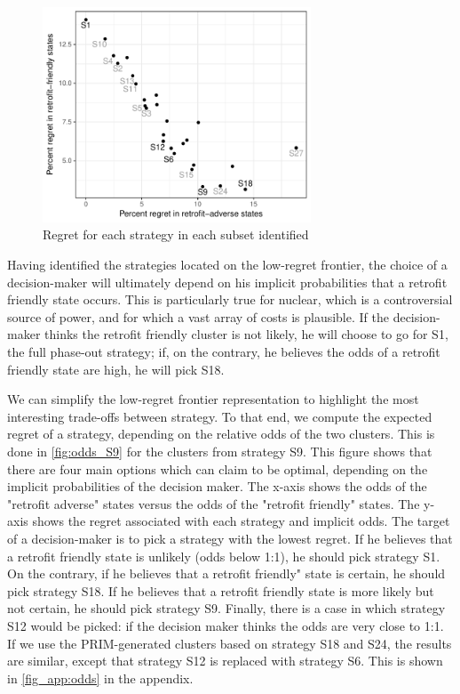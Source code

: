 \begin{figure}[!ht]
	\centering
	\includegraphics[width=8cm]{figures/low_regret_frontier_S9.pdf}
	\caption{Regret for each strategy in each subset identified}
	\label{fig:low_regret_frontier_S9}
\end{figure}

Having identified the strategies located on the low-regret frontier, the choice of a decision-maker will ultimately depend on his implicit probabilities that a retrofit friendly state occurs. 
This is particularly true for nuclear, which is a controversial source of power, and for which a vast array of costs is plausible. 
If the decision-maker thinks the retrofit friendly cluster is not likely, he will choose to go for S1, the full phase-out strategy; if, on the contrary, he believes the odds of a retrofit friendly state are high, he will pick S18. 

We can simplify the low-regret frontier representation to highlight the most interesting trade-offs between strategy. To that end, we compute the expected regret of a strategy, depending on the relative odds of the two clusters. This is done in \cref{fig:odds_S9} for the clusters from strategy S9. This figure shows that there are four main options which can claim to be optimal, depending on the implicit probabilities of the decision maker. 
The x-axis shows the odds of the "retrofit adverse" states versus the odds of the "retrofit friendly" states. 
The y-axis shows the regret associated with each strategy and implicit odds. 
The target of a decision-maker is to pick a strategy with the lowest regret. 
If he believes that a retrofit friendly state is unlikely (odds below 1:1), he should pick strategy S1. 
On the contrary, if he believes that a retrofit friendly" state is certain, he should pick strategy S18.
If he believes that a retrofit friendly state is more likely but not certain, he should pick strategy S9.
Finally, there is a case in which strategy S12 would be picked: if the decision maker thinks the odds are very close to 1:1.
If we use the PRIM-generated clusters based on strategy S18 and S24, the results are similar, except that strategy S12 is replaced with strategy S6. This is shown in \cref{fig_app:odds} in the appendix.


